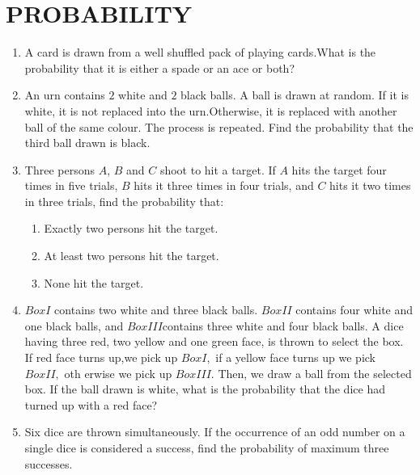 \documentclass[12pt]{article}
\begin{document}
		\section{PROBABILITY}
		\begin{enumerate}
			\item A card is drawn from a well shuffled pack of playing cards.What is the probability that it is either a spade or an ace or both?

			\item An urn contains $2$ white and $2$ black balls. A ball is drawn at random. If it is white, it is not replaced into the urn.Otherwise, it is replaced with another ball of the same colour. The process is repeated. Find the probability that the third ball drawn is black.
			
			\item Three persons $A$, $B$ and $C$ shoot to hit a target. If $A$ hits the target four times in five trials, $B$ hits it three times in four trials, and $C$ hits it two times in three trials, find the probability that:\\ \begin{enumerate}	[label=\roman*)] \item Exactly two persons hit the target.
					\item  At least two persons hit the target.
			\item  None hit the target.
			\end{enumerate}
		\item $Box I$ contains two white and three black balls. $Box II$ contains four white and one black balls, and $Box III$contains three white and four black balls. A dice having three red, two yellow and one green face, is thrown to select the box. If red face turns up,we pick up $Box I,$ if a yellow face turns up we pick $Box II,$ oth    erwise we pick up $Box III.$ Then, we draw a ball from the selected box. If the ball drawn is white, what is the probability that the dice had turned up with a red face?

		\item Six dice are thrown simultaneously. If the occurrence of an odd number on a single dice is considered a success, find the probability of maximum three successes.
		\end{enumerate}
\end{document}
